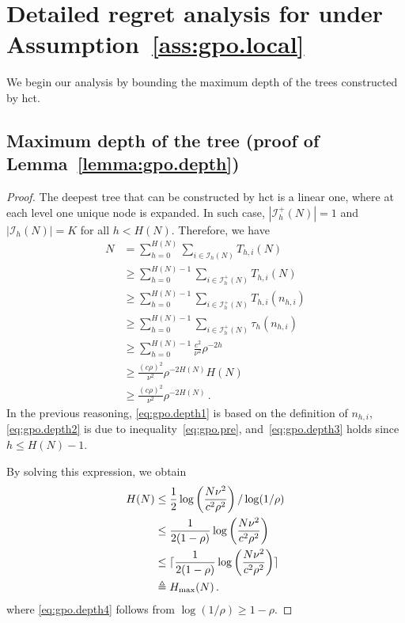 \section{Detailed regret analysis for \HCT{} under Assumption~\ref{ass:gpo.local}}\label{app:gpo.hct}

We begin our analysis by bounding the maximum depth of the trees constructed by \gls{hct}.

\subsection{Maximum depth of the tree (proof of Lemma~\ref{lemma:gpo.depth})}\label{proof:lemma_depth}
\restalemmadepth*

\begin{proof}
The deepest tree that can be constructed by \gls{hct} is a linear one, where at each level one unique node is expanded. In such case,   $|\mathcal{I}_h^{+}(N)|=1$ and $|\mathcal{I}_h(N)|=K$ for all $h<H(N)$. Therefore, we have
\begingroup
\allowdisplaybreaks
\begin{align}
    N & = \sum_{h=0}^{H(N)}\sum_{i\in\mathcal{I}_h(N)} T_{h,i}(N) \nonumber \\
      & \geq \sum_{h=0}^{H(N)-1}\sum_{i\in\mathcal{I}_h^{+}(N)} T_{h,i}(N) \nonumber \\
      & \geq \sum_{h=0}^{H(N)-1}\sum_{i\in\mathcal{I}_h^{+}(N)} T_{h,i}(n_{h,i}) \nonumber \\
      & \geq \sum_{h=0}^{H(N)-1}\sum_{i\in\mathcal{I}_h^{+}(N)} \tau_h(n_{h,i}) \label{eq:gpo.depth1} \\
      & \geq \sum_{h=0}^{H(N)-1}\frac{c^2}{\nu^2}\rho^{-2h} \label{eq:gpo.depth2} \\
      & \geq \frac{(c\rho)^2}{\nu^2}\rho^{-2H(N)}H(N) \label{eq:gpo.depth3} \\
      & \geq \frac{(c\rho)^2}{\nu^2}\rho^{-2H(N)} \nonumber \,.
\end{align}
\endgroup
In the previous reasoning, \eqref{eq:gpo.depth1} is based on the definition of $n_{h,i}$, \eqref{eq:gpo.depth2} is due to inequality~\eqref{eq:gpo.pre}, and~\eqref{eq:gpo.depth3} holds since $h\leq H(N)-1$.

By solving this expression, we obtain
\begingroup
\allowdisplaybreaks
\begin{align}
    H(N) & \leq \frac{1}{2}\log\left(\frac{N\nu^2}{c^2\rho^2} \right)/\log(1/\rho) \nonumber \\
         & \leq \frac{1}{2(1-\rho)}\log\left(
    \frac{N\nu^2}{c^2\rho^2} \right) \label{eq:gpo.depth4} \\
	& \leq \lceil\frac{1}{2(1-\rho)}\log\left(
    \frac{N\nu^2}{c^2\rho^2} \right)\rceil \nonumber \\
         & \triangleq H_{\max}(N) \nonumber \,.
\end{align}
\endgroup
where \eqref{eq:gpo.depth4} follows from $\log(1/\rho)\geq 1-\rho$.
\end{proof}

